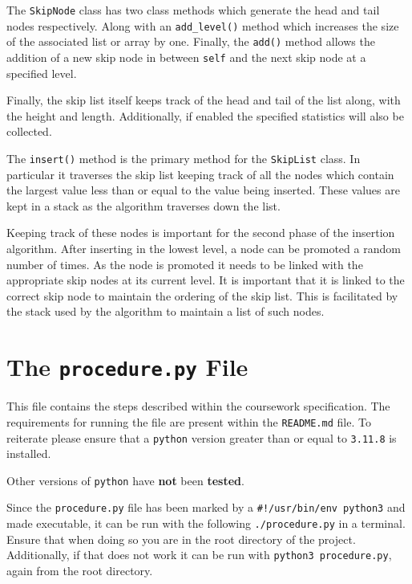 \documentclass[article]{uom-coursework}
\begin{document}
The \texttt{SkipNode} class has two class methods which generate
the head and tail nodes respectively. Along with an
\texttt{add\_level()} method which increases the size of the
associated list or array by one. Finally, the \texttt{add()}
method allows the addition of a new skip node in between
\texttt{self} and the next skip node at a specified level.

Finally, the skip list itself keeps track of the head and tail
of the list along, with the height and length. Additionally, if
enabled the specified statistics will also be collected.

The \texttt{insert()} method is the primary method for the
\texttt{SkipList} class. In particular it traverses the skip
list keeping track of all the nodes which contain the largest
value less than or equal to the value being inserted. These
values are kept in a stack as the algorithm traverses down the
list.

Keeping track of these nodes is important for the second phase
of the insertion algorithm. After inserting in the lowest level,
a node can be promoted a random number of times. As the node is
promoted it needs to be linked with the appropriate skip nodes
at its current level. It is important that it is linked to the
correct skip node to maintain the ordering of the skip list.
This is facilitated by the stack used by the algorithm to
maintain a list of such nodes.

\section{The \texttt{procedure.py} File}

This file contains the steps described within the coursework
specification. The requirements for running the file are present
within the \texttt{README.md} file. To reiterate please ensure
that a \texttt{python} version greater than or equal to
\texttt{3.11.8} is installed. 

\begin{noteline}
Other versions of \texttt{python} have \textbf{not} been \textbf{tested}.
\end{noteline}

Since the \texttt{procedure.py} file has been marked by a
\texttt{\#!/usr/bin/env python3} and made executable, it can be
run with the following \texttt{./procedure.py} in a terminal.
Ensure that when doing so you are in the root directory of the
project. Additionally, if that does not work it can be run with
\texttt{python3 procedure.py}, again from the root directory.
\end{document}
